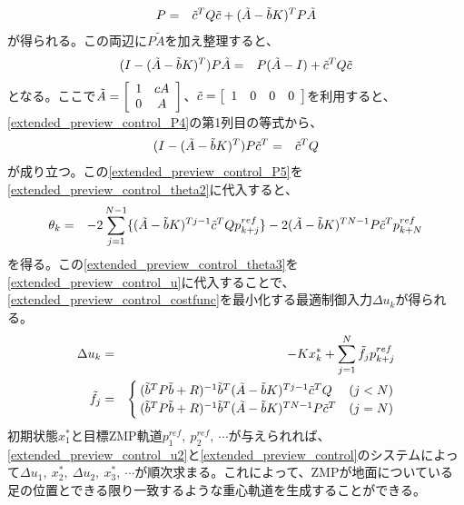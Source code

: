 \begin{eqnarray}
  P &=& \tilde{c}^T Q \tilde{c} + (\tilde{A} - \tilde{b} K)^T P \tilde{A} \eqlabel{extended_preview_control_P3}
\end{eqnarray}
が得られる。この両辺に$P \tilde{A}$を加え整理すると、
\begin{eqnarray}
  (I - (\tilde{A} - \tilde{b} K)^{T}) P \tilde{A} &=& P (\tilde{A} - I) + \tilde{c}^T Q \tilde{c} \eqlabel{extended_preview_control_P4}
\end{eqnarray}
となる。ここで$\tilde{A} = \left[\begin{array}{c c} 1 & cA\\ 0 & A \end{array} \right]$、$\tilde{c} = \left[\begin{array}{c c c c} 1 & 0 & 0 & 0 \end{array} \right]$を利用すると、\eqref{extended_preview_control_P4}の第1列目の等式から、
\begin{eqnarray}
  (I - (\tilde{A} - \tilde{b} K)^{T}) P \tilde{c}^T &=& \tilde{c}^T Q \eqlabel{extended_preview_control_P5}
\end{eqnarray}
が成り立つ。この\eqref{extended_preview_control_P5}を\eqref{extended_preview_control_theta2}に代入すると、
\begin{eqnarray}
  \theta_k &=& -2 \sum_{j=1}^{N-1} \{ (\tilde{A} - \tilde{b} K)^{T j-1} \tilde{c}^T Q p_{k+j}^{ref} \} -2 (\tilde{A} - \tilde{b} K)^{T N-1} P \tilde{c}^T p_{k+N}^{ref} \eqlabel{extended_preview_control_theta3}
\end{eqnarray}
を得る。この\eqref{extended_preview_control_theta3}を\eqref{extended_preview_control_u}に代入することで、\eqref{extended_preview_control_costfunc}を最小化する最適制御入力$\Delta u_k$が得られる。
\begin{eqnarray}
  \Delta u_k &=& -K x_k^\ast + \sum_{j=1}^N \tilde{f}_j p_{k+j}^{ref}\eqlabel{extended_preview_control_u2}\\
  \tilde{f}_j &=& \begin{cases}
    (\tilde{b}^T P \tilde{b} + R )^{-1} \tilde{b}^T (\tilde{A} - \tilde{b} K)^{T j-1} \tilde{c}^T Q & (j<N) \\
    (\tilde{b}^T P \tilde{b} + R )^{-1} \tilde{b}^T (\tilde{A} - \tilde{b} K)^{T N-1} P \tilde{c}^T & (j=N)
  \end{cases}\nonumber
\end{eqnarray}
初期状態$x_1^\ast$と目標ZMP軌道$p_{1}^{ref},~p_{2}^{ref},~\cdots$が与えられれば、\eqref{extended_preview_control_u2}と\eqref{extended_preview_control}のシステムによって$\Delta u_1,~x_2^\ast,~\Delta u_2,~x_3^\ast,~\cdots$が順次求まる。これによって、ZMPが地面についている足の位置とできる限り一致するような重心軌道を生成することができる。

